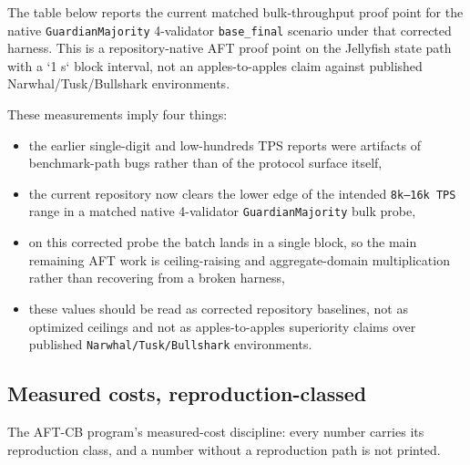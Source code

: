 \documentclass[11pt]{article}
\newcommand{\code}[1]{\texttt{#1}}
\begin{document}
The table below reports the current matched bulk-throughput proof point for the
native \code{GuardianMajority} 4-validator \code{base\_final} scenario under
that corrected harness. This is a repository-native AFT proof point on the
Jellyfish state path with a `1 s` block interval, not an apples-to-apples claim
against published Narwhal/Tusk/Bullshark environments.

\begin{center}
\scriptsize
{}
\end{center}

These measurements imply four things:

\begin{itemize}[leftmargin=1.5em]
\item the earlier single-digit and low-hundreds TPS reports were artifacts of
benchmark-path bugs rather than of the protocol surface itself,
\item the current repository now clears the lower edge of the intended
\code{8k--16k TPS} range in a matched native 4-validator
\code{GuardianMajority} bulk probe,
\item on this corrected probe the batch lands in a single block, so the main
remaining AFT work is ceiling-raising and aggregate-domain multiplication rather
than recovering from a broken harness,
\item these values should be read as corrected repository baselines, not as
optimized ceilings and not as apples-to-apples superiority claims over
published \code{Narwhal/Tusk/Bullshark} environments.
\end{itemize}

\subsection{Measured costs, reproduction-classed}
\label{sec:measured-costs}

The AFT-CB program's measured-cost discipline: every number carries its
reproduction class, and a number without a reproduction path is not
printed.
\end{document}
